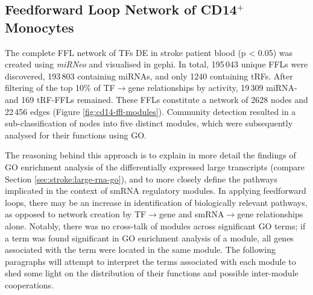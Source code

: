 \subsection{Feedforward Loop Network of CD14$^+$ Monocytes} \label{sec:stroke:ffl-cd14}
The complete FFL network of TFs DE in stroke patient blood (p < 0.05) was created using \emph{miRNeo} and visualised in gephi. In total, 195\,043 unique FFLs were discovered, 193\,803 containing miRNAs, and only 1240 containing tRFs. After filtering of the top 10\% of TF$\to$gene relationships by activity, 19\,309 miRNA- and 169 tRF-FFLs remained. These FFLs constitute a network of 2628 nodes and 22\,456 edges (Figure \ref{fig:cd14-ffl-modules}). Community detection\cite{Blondel2008} resulted in a sub-classification of nodes into five distinct modules, which were subsequently analysed for their functions using GO.

The reasoning behind this approach is to explain in more detail the findings of GO enrichment analysis of the differentially expressed large transcripts (compare Section \ref{sec:stroke:large-rna-go}), and to more closely define the pathways implicated in the context of smRNA regulatory modules. In applying feedforward loops, there may be an increase in identification of biologically relevant pathways, as opposed to network creation by TF$\to$gene and smRNA$\to$gene relationships alone. Notably, there was no cross-talk of modules across significant GO terms; if a term was found significant in GO enrichment analysis of a module, all genes associated with the term were located in the same module. The following paragraphs will attempt to interpret the terms associated with each module to shed some light on the distribution of their functions and possible inter-module cooperations.

